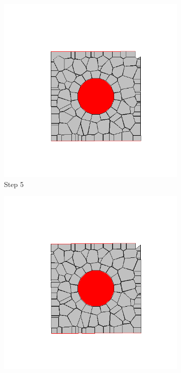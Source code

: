 \begin{figure}[ht!]
      \begin{subfigure}{.25\textwidth}
        \centering
        \includegraphics[width=1.0\linewidth]{Files/Small_DEF/CR/DEP5-STEP(005).png}
      \caption{Step 5}
      \end{subfigure}%
      \begin{subfigure}{.25\textwidth}
        \centering
        \includegraphics[width=1.0\linewidth]{Files/Small_DEF/CR/DEP5-STEP(006).png}

\end{subfigure}
\end{figure}
